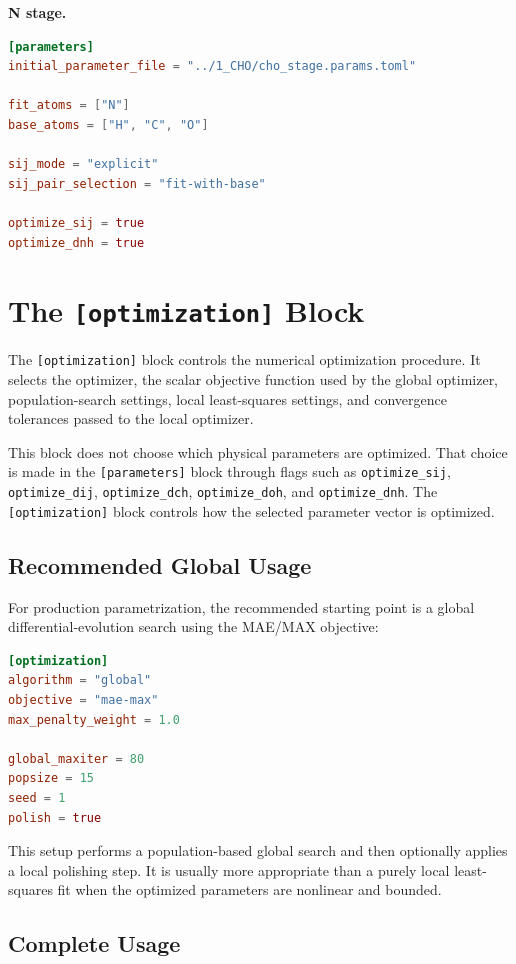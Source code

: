 \documentclass[11pt]{article}
\begin{document}
\textbf{N stage.}

\begin{lstlisting}[language=toml]
[parameters]
initial_parameter_file = "../1_CHO/cho_stage.params.toml"

fit_atoms = ["N"]
base_atoms = ["H", "C", "O"]

sij_mode = "explicit"
sij_pair_selection = "fit-with-base"

optimize_sij = true
optimize_dnh = true
\end{lstlisting}

\section{The \texttt{[optimization]} Block}

The \texttt{[optimization]} block controls the numerical optimization procedure.
It selects the optimizer, the scalar objective function used by the global
optimizer, population-search settings, local least-squares settings, and
convergence tolerances passed to the local optimizer.

This block does not choose which physical parameters are optimized. That choice
is made in the \texttt{[parameters]} block through flags such as
\texttt{optimize\_sij}, \texttt{optimize\_dij}, \texttt{optimize\_dch},
\texttt{optimize\_doh}, and \texttt{optimize\_dnh}. The
\texttt{[optimization]} block controls how the selected parameter vector is
optimized.

\subsection{Recommended Global Usage}

For production parametrization, the recommended starting point is a global
differential-evolution search using the MAE/MAX objective:

\begin{lstlisting}[language=toml]
[optimization]
algorithm = "global"
objective = "mae-max"
max_penalty_weight = 1.0

global_maxiter = 80
popsize = 15
seed = 1
polish = true
\end{lstlisting}

This setup performs a population-based global search and then optionally applies
a local polishing step. It is usually more appropriate than a purely local
least-squares fit when the optimized parameters are nonlinear and bounded.

\subsection{Complete Usage}
\end{document}
